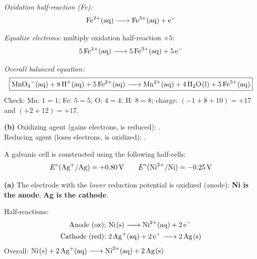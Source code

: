 \documentclass[addpoints]{exam}
\begin{document}
\begin{questions}
\begin{solution}[10cm]
\textit{Oxidation half-reaction (Fe):}
\[
\ce{Fe^{2+}(aq) -> Fe^{3+}(aq) + e-}
\]

\textit{Equalize electrons:} multiply oxidation half-reaction $\times 5$:
\[
\ce{5Fe^{2+}(aq) -> 5Fe^{3+}(aq) + 5e-}
\]

\textit{Overall balanced equation:}
\[
\boxed{\ce{MnO4-(aq) + 8H+(aq) + 5Fe^{2+}(aq) -> Mn^{2+}(aq) + 4H2O(l) + 5Fe^{3+}(aq)}}
\]
Check: Mn: $1=1$; Fe: $5=5$; O: $4=4$; H: $8=8$; charge: $(−1+8+10)=+17$ and $(+2+12)=+17$. \checkmark

\textbf{(b)} Oxidizing agent (gains electrons, is reduced): \textbf{}.\\
Reducing agent (loses electrons, is oxidized): \textbf{}.
\end{solution}

\question A galvanic cell is constructed using the following half-cells:
\[
E^\circ(\ce{Ag+/Ag}) = +\SI{0.80}{V} \qquad E^\circ(\ce{Ni^{2+}/Ni}) = -\SI{0.25}{V}
\]
\begin{solution}[9cm]
\textbf{(a)} The electrode with the \textit{lower} reduction potential is oxidized (anode):
\textbf{Ni is the anode}; \textbf{Ag is the cathode}.

Half-reactions:
\begin{align*}
\text{Anode (ox):}\ &\ce{Ni(s) -> Ni^{2+}(aq) + 2e-} \\
\text{Cathode (red):}\ &\ce{2Ag+(aq) + 2e- -> 2Ag(s)}
\end{align*}
Overall: $\ce{Ni(s) + 2Ag+(aq) -> Ni^{2+}(aq) + 2Ag(s)}$


\end{solution}
\end{questions}
\end{document}
